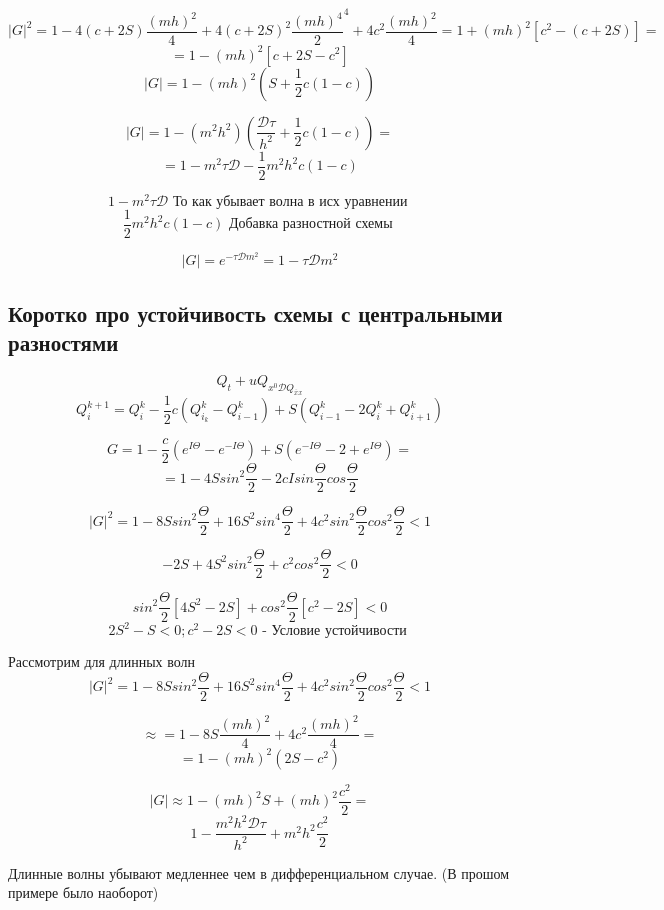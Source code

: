 \documentclass[14pt]{extarticle}
\begin{document}
\[ {|G|}^2 = 1 - 4 (c + 2S) \frac{{(mh)}^2}{4} + 4 (c +2S)^2 \frac{{(mh)}^4}{2}^4 + 4c^2 \frac{{(mh)}^2}{4} = 1 + {(mh)}^2 [ c^2 - (c+ 2S)] =  \]
\[ = 1 - (mh)^2 [ c+2S - c^2] \]
\[ |G| = 1 - {(mh)}^2 (S + \frac{1}{2} c(1-c)) \label{eq:1*} \]

\[ |G| = 1 - (m^2 h^2) (\frac{\mathcal{D} \tau}{h^2} + \frac{1}{2} c (1-c)) =  \]
\[ = 1 - m^2 \tau \mathcal{D} - \frac{1}{2} m^2 h^2 c (1-c) \]

\[ 1 - m^2 \tau \mathcal{D}\textrm{ То как убывает волна в исх уравнении } \]
\[ \frac{1}{2} m^2 h^2 c (1-c) \textrm{ Добавка разностной схемы } \]

\[ |G| = e^{-\tau \mathcal{D} m^2} = 1 - \tau \mathcal{D} m^2 \]

\subsection{Коротко про устойчивость схемы с центральными разностями}

\[ Q_t + u Q_{x^0  \mathcal{D }Q_{\overline{x }x}} \]
\[ Q^{k+1}_i = Q^k_i - \frac{1}{2} c (Q^k_{i_k} - Q^k_{i-1}) + S(Q_{i-1}^k - 2 Q^k_i + Q_{i+1}^k) \]

\[ G = 1 - \frac{c }{2} (e^{I \Theta} - e^{-I \Theta}) + S(e^{-I\Theta} - 2 + e^{I\Theta}) = \]
\[ = 1- 4 S {sin}^2 \frac{\Theta}{2} -2 c I sin \frac{\Theta}{2} cos\frac{\Theta}{2} \]

\[ {|G|}^2 = 1 - 8 S {sin}^2 \frac{\Theta}{2} + 16 S^2 {sin}^4 \frac{\Theta}{2} + 4c^2 {sin}^2 \frac{\Theta}{2} {cos}^2 \frac{\Theta}{2} < 1\]

\[ -2S+4S^2 {sin}^2 \frac{\Theta}{2} + c^2 {cos}^2 \frac{\Theta}{2} < 0 \]

\[ {sin}^2 \frac{\Theta}{2} [4S^2 - 2S] + {cos}^2 \frac{\Theta}{2}[c^2 - 2S] < 0 \]
\[ 2S^2 - S < 0; c^2-2S < 0 \textrm{ - Условие устойчивости } \]


Рассмотрим для длинных волн
\[ {|G|}^2 = 1 - 8 S {sin}^2 \frac{\Theta}{2} + 16 S^2 {sin}^4 \frac{\Theta}{2} + 4c^2 {sin}^2 \frac{\Theta}{2} {cos}^2 \frac{\Theta}{2} < 1\]

\[ \approx = 1 - 8 S \frac{{(mh)^2}}{4}+ 4 c^2\frac{{(mh)}^2}{4} =  \]
\[ = 1 - {(mh)}^2(2S-c^2) \]

\[ |G| \approx 1 - {(mh)}^2 S + {(mh)}^2 \frac{c^2}{2} =  \]
\[ 1 - \frac{m^2 h^2 \mathcal{D} \tau}{h^2} + m^2 h^2 \frac{c^2}{2} \]

Длинные волны убывают медленнее чем в дифференциальном случае. (В прошом примере было наоборот)
\end{document}
